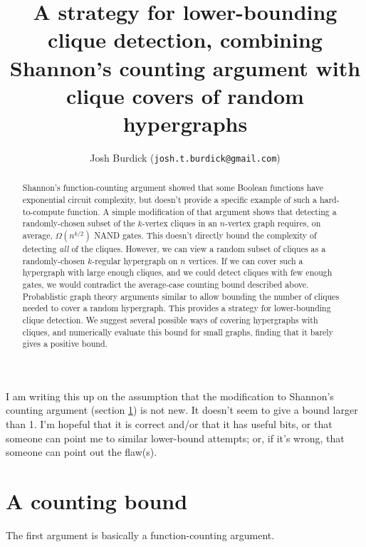 \documentclass[12pt]{article}
\theoremstyle{definition}
\begin{document}
\title{A strategy for lower-bounding clique detection, combining
Shannon's counting argument with clique covers of random hypergraphs}

\author{Josh Burdick ({\tt josh.t.burdick@gmail.com})}
\maketitle
\begin{abstract}
Shannon's function-counting argument
\cite{shannon_synthesis_1949} showed that some Boolean functions have
exponential circuit complexity, but doesn't provide a specific example
of such a hard-to-compute function. A simple modification of that argument
shows that detecting a randomly-chosen subset of the $k$-vertex cliques in an
$n$-vertex graph requires, on average, $\Omega(n^{k/2})$ NAND gates.
This doesn't directly bound the complexity of detecting {\em all} of the cliques.
However, we can view a random subset of cliques as a randomly-chosen
$k$-regular hypergraph on $n$ vertices.
If we can cover such a hypergraph with large enough cliques,
and we could detect cliques with few enough gates, we would contradict
the average-case counting bound described above.
Probablistic graph theory arguments
\cite{bollobas1976cliques} similar to \cite{bollobas1993clique}
allow bounding the number of cliques needed to
cover a random hypergraph.
This provides a strategy for lower-bounding clique detection.
We suggest several possible ways of covering hypergraphs with cliques,
and numerically evaluate this bound for small graphs, finding that
it barely gives a positive bound.
\end{abstract}

I am writing this up on the assumption that the modification
to Shannon's counting argument (section \ref{countingBound})
is not new. It doesn't seem to give a bound larger than 1.
I'm hopeful that it is correct and/or that it has useful bits,
or that someone can point me
to similar lower-bound attempts; or, if it's wrong, that 
someone can point out the flaw(s).

\newpage

\tableofcontents

\section{A counting bound} \label{countingBound}

The first argument is basically a function-counting argument.
\end{document}
